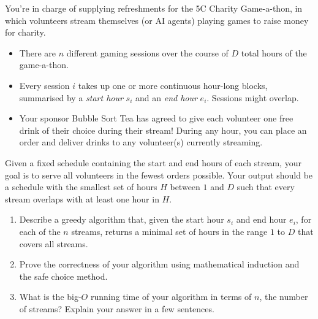 \documentclass[12 pt, letterpaper]{hmcpset}
\begin{document}
\begin{problem}
	You're in charge of supplying refreshments for the 5C Charity Game-a-thon, in which volunteers stream themselves (or AI agents) playing games to raise money for charity.
	\begin{itemize}
		\item There are $n$ different gaming sessions over the course of $D$ total hours of the game-a-thon.
		\item Every session $i$ takes up one or more continuous hour-long blocks, summarised by a \emph{start hour} $s_{i}$ and an \emph {end hour} $e_{i}$. Sessions might overlap.

		\item Your sponsor Bubble Sort Tea has agreed to give each volunteer one free drink of their choice during their stream! During any hour, you can place an order and deliver drinks to any volunteer(s) currently streaming.
	\end{itemize}

	Given a fixed schedule containing the start and end hours of each stream, your goal is to serve all volunteers in the fewest orders possible. Your output should be a schedule with the smallest set of hours $H$ between $1$ and $D$ such that every stream overlaps with at least one hour in $H$.

	\begin{enumerate}
		\item Describe a greedy algorithm that, given the start hour $s_{i}$ and end hour $e_{i}$, for each of the $n$ streams, returns a minimal set of hours in the range $1$ to $D$ that covers all streams.

		\item Prove the correctness of your algorithm using mathematical induction and the safe choice method.

		\item What is the big-$O$ running time of your algorithm in terms of $n$, the number of streams? Explain your answer in a few sentences.
	\end{enumerate}
\end{problem}
\end{document}
